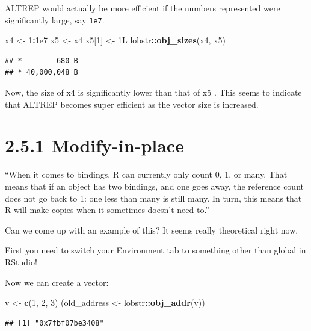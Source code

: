 \documentclass[]{book}
\newenvironment{Shaded}{\begin{snugshade}}{\end{snugshade}}
\newcommand{\DecValTok}[1]{\textcolor[rgb]{0.00,0.00,0.81}{#1}}
\newcommand{\FloatTok}[1]{\textcolor[rgb]{0.00,0.00,0.81}{#1}}
\newcommand{\KeywordTok}[1]{\textcolor[rgb]{0.13,0.29,0.53}{\textbf{#1}}}
\newcommand{\NormalTok}[1]{#1}
\newcommand{\OperatorTok}[1]{\textcolor[rgb]{0.81,0.36,0.00}{\textbf{#1}}}
\newcommand{\StringTok}[1]{\textcolor[rgb]{0.31,0.60,0.02}{#1}}
\begin{document}
ALTREP would actually be more efficient if the numbers represented were significantly large, say \texttt{1e7}.

\begin{Shaded}
\begin{Highlighting}[]
\NormalTok{x4 <-}\StringTok{ }\DecValTok{1}\OperatorTok{:}\FloatTok{1e7}
\NormalTok{x5 <-}\StringTok{ }\NormalTok{x4}
\NormalTok{x5[}\DecValTok{1}\NormalTok{] <-}\StringTok{ }\NormalTok{1L}
\NormalTok{lobstr}\OperatorTok{::}\KeywordTok{obj_sizes}\NormalTok{(x4, x5)}
\end{Highlighting}
\end{Shaded}

\begin{verbatim}
## *        680 B
## * 40,000,048 B
\end{verbatim}

Now, the size of x4 is significantly lower than that of x5 . This seems to indicate that ALTREP becomes super efficient as the vector size is increased.

\hypertarget{modify-in-place}{%
\section*{2.5.1 Modify-in-place}\label{modify-in-place}}

``When it comes to bindings, R can currently only count 0, 1, or many. That means that if an object has two bindings, and one goes away, the reference count does not go back to 1: one less than many is still many. In turn, this means that R will make copies when it sometimes doesn't need to.''

Can we come up with an example of this? It seems really theoretical right now.

First you need to switch your Environment tab to something other than global in RStudio!

Now we can create a vector:

\begin{Shaded}
\begin{Highlighting}[]
\NormalTok{v <-}\StringTok{ }\KeywordTok{c}\NormalTok{(}\DecValTok{1}\NormalTok{, }\DecValTok{2}\NormalTok{, }\DecValTok{3}\NormalTok{)}
\NormalTok{(old_address <-}\StringTok{ }\NormalTok{lobstr}\OperatorTok{::}\KeywordTok{obj_addr}\NormalTok{(v))}
\end{Highlighting}
\end{Shaded}

\begin{verbatim}
## [1] "0x7fbf07be3408"
\end{verbatim}
\end{document}
